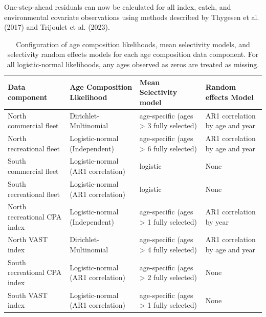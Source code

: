 \documentclass[
]{article}
\begin{document}
One-step-ahead residuals can now be calculated for all index, catch, and
environmental covariate observations using methods described by Thygesen
et al. (2017) and Trijoulet et al. (2023).

\setcounter{table}{0}
\renewcommand\thetable{S\arabic{table}}

\begin{landscape}\begin{table}

\caption{\label{tab:age-comp-sel-table}Configuration of age composition likelihoods, mean selectivity models, and selectivity random effects models for each age composition data component. For all logistic-normal likelihoods, any ages observed as zeros are treated as missing.}
\centering
\begin{tabular}[t]{llll}
\toprule
Data component & Age Composition Likelihood & Mean Selectivity model & Random effects Model\\
\midrule
North commercial fleet & Dirichlet-Multinomial & age-specific (ages > 3 fully selected) & AR1 correlation by age and year\\
North recreational fleet & Logistic-normal (Independent) & age-specific (ages > 6 fully selected) & AR1 correlation by age and year\\
South commercial fleet & Logistic-normal (AR1 correlation) & logistic & None\\
South recreational fleet & Logistic-normal (AR1 correlation) & logistic & None\\
North recreational CPA index & Logistic-normal (Independent) & age-specific (ages > 1 fully selected) & AR1 correlation by year\\
\addlinespace
North VAST index & Dirichlet-Multinomial & age-specific (ages > 4 fully selected) & AR1 correlation by age and year\\
South recreational CPA index & Logistic-normal (AR1 correlation) & age-specific (ages > 2 fully selected) & None\\
South VAST index & Logistic-normal (AR1 correlation) & age-specific (ages > 1 fully selected) & None\\
\bottomrule
\end{tabular}
\end{table}
\end{landscape}

\setcounter{figure}{0}
\renewcommand\thefigure{S\arabic{figure}}

\pagebreak
\end{document}
